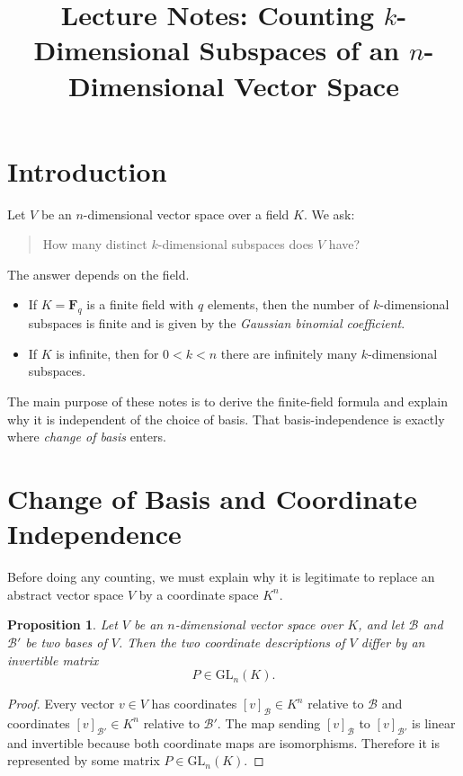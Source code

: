 \documentclass[11pt]{article}
\title{Lecture Notes: Counting \(k\)-Dimensional Subspaces of an \(n\)-Dimensional Vector Space}
\author{}
\date{}
\newtheorem{proposition}[theorem]{Proposition}
\theoremstyle{definition}
\theoremstyle{remark}
\newcommand{\F}{\mathbf{F}}
\newcommand{\GL}{\mathrm{GL}}
\begin{document}
	
	\maketitle
	
	\tableofcontents
	
	\section{Introduction}
	
	Let \(V\) be an \(n\)-dimensional vector space over a field \(K\). We ask:
	
	\begin{quote}
		How many distinct \(k\)-dimensional subspaces does \(V\) have?
	\end{quote}
	
	The answer depends on the field.
	
	\begin{itemize}
		\item If \(K=\F_q\) is a finite field with \(q\) elements, then the number of \(k\)-dimensional subspaces is finite and is given by the \emph{Gaussian binomial coefficient}.
		\item If \(K\) is infinite, then for \(0<k<n\) there are infinitely many \(k\)-dimensional subspaces.
	\end{itemize}
	
	The main purpose of these notes is to derive the finite-field formula and explain why it is independent of the choice of basis. That basis-independence is exactly where \emph{change of basis} enters.
	
	\section{Change of Basis and Coordinate Independence}
	
	Before doing any counting, we must explain why it is legitimate to replace an abstract vector space \(V\) by a coordinate space \(K^n\).
	
	\begin{proposition}
		Let \(V\) be an \(n\)-dimensional vector space over \(K\), and let \(\mathcal B\) and \(\mathcal B'\) be two bases of \(V\). Then the two coordinate descriptions of \(V\) differ by an invertible matrix
		\[
		P\in \GL_n(K).
		\]
	\end{proposition}
	
	\begin{proof}
		Every vector \(v\in V\) has coordinates \([v]_{\mathcal B}\in K^n\) relative to \(\mathcal B\) and coordinates \([v]_{\mathcal B'}\in K^n\) relative to \(\mathcal B'\). The map sending \([v]_{\mathcal B}\) to \([v]_{\mathcal B'}\) is linear and invertible because both coordinate maps are isomorphisms. Therefore it is represented by some matrix \(P\in \GL_n(K)\).
	\end{proof}
	
\end{document}
